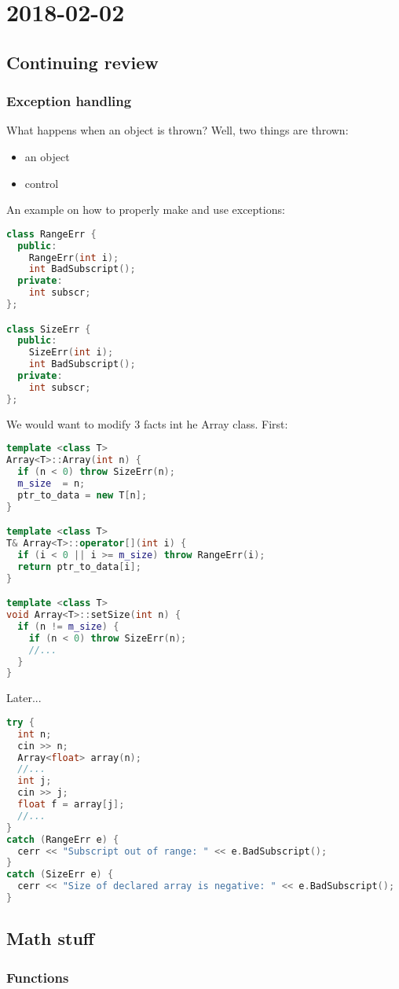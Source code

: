 \section{2018-02-02}

\subsection{Continuing review}

\subsubsection{Exception handling}

What happens when an object is thrown? Well, two things are thrown:

\begin{itemize}
  \item an object
  \item control
\end{itemize}

An example on how to properly make and use exceptions:

\begin{lstlisting}[language=C++]
class RangeErr {
  public:
    RangeErr(int i);
    int BadSubscript();
  private:
    int subscr; 
};

class SizeErr {
  public:
    SizeErr(int i);
    int BadSubscript();
  private:
    int subscr; 
};
\end{lstlisting}

We would want to modify 3 facts int he Array class. First:

\begin{lstlisting}[language=C++]
template <class T>
Array<T>::Array(int n) {
  if (n < 0) throw SizeErr(n);
  m_size  = n;
  ptr_to_data = new T[n];
}

template <class T>
T& Array<T>::operator[](int i) {
  if (i < 0 || i >= m_size) throw RangeErr(i);
  return ptr_to_data[i];
}

template <class T>
void Array<T>::setSize(int n) {
  if (n != m_size) {
    if (n < 0) throw SizeErr(n);
    //...
  }
}
\end{lstlisting}

Later...

\begin{lstlisting}[language=C++]
try {
  int n;
  cin >> n;
  Array<float> array(n);
  //...
  int j;
  cin >> j;
  float f = array[j];
  //...
}
catch (RangeErr e) {
  cerr << "Subscript out of range: " << e.BadSubscript();
}
catch (SizeErr e) {
  cerr << "Size of declared array is negative: " << e.BadSubscript();
}
\end{lstlisting}

\subsection{Math stuff}

\subsubsection{Functions}

\begin{equation*}
\end{equation*}